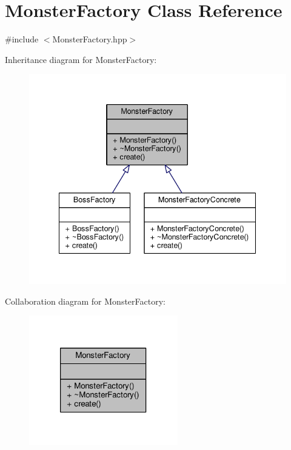 \hypertarget{class_monster_factory}{\section{Monster\-Factory Class Reference}
\label{class_monster_factory}
}


{\ttfamily \#include $<$Monster\-Factory.\-hpp$>$}



Inheritance diagram for Monster\-Factory\-:\nopagebreak
\begin{figure}[H]
\begin{center}
\leavevmode
\includegraphics[width=337pt]{class_monster_factory__inherit__graph}
\end{center}
\end{figure}


Collaboration diagram for Monster\-Factory\-:\nopagebreak
\begin{figure}[H]
\begin{center}
\leavevmode
\includegraphics[width=184pt]{class_monster_factory__coll__graph}
\end{center}
\end{figure}
